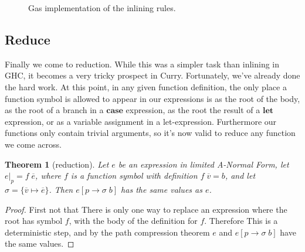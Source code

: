 \documentclass{book}
\makeatletter
\newtheorem{theorem}{Theorem}
\theoremstyle{definition}
\newcommand{\Conid}[1]{\mathit{#1}}
\newcommand{\Varid}[1]{\mathit{#1}}
\newcommand{\anonymous}{\kern0.06em \vbox{\hrule\@width.5em}}
\def\resethooks{%
  \global\let\SaveRestoreHook\empty
  \global\let\ColumnHook\empty}
\newlength{\blanklineskip}
\makeatother
\begin{document}
\begin{figure}
\resethooks
\caption{Gas implementation of the inlining rules.}
\label{fig:inlineCode}
\end{figure}

\subsection{Reduce}

Finally we come to reduction.
While this was a simpler task than inlining in GHC,
it becomes a very tricky prospect in Curry.
Fortunately, we've already done the hard work.
At this point, in any given function definition,
the only place a function symbol is allowed to appear in our expressions is
as the root of the body,
as the root of a branch in a \ensuremath{\mathbf{case}} expression,
as the root the result of a \ensuremath{\mathbf{let}} expression,
or as a variable assignment in a let-expression.
Furthermore our functions only contain trivial arguments,
so it's now valid to reduce any function we come across.

\begin{theorem}[reduction]
Let \ensuremath{\Varid{e}} be an expression in limited A-Normal Form,
let \ensuremath{\Varid{e}|_{\Varid{p}}\mathrel{=}\Varid{f}\;\overline{\Varid{e}} },
where \ensuremath{\Varid{f}} is a function symbol with definition \ensuremath{\Varid{f}\;\overline{\Varid{v}} \mathrel{=}\Varid{b}},
and let $\sigma = \{\overline{ v } \mapsto \overline{e}\}$.
Then \ensuremath{\Varid{e}[\Varid{p}\to\sigma\;\Varid{b}]}
has the same values as \ensuremath{\Varid{e}}.
\end{theorem}

\begin{proof}
First not that There is only one way to replace an expression
where the root has symbol \ensuremath{\Varid{f}}, with the body of the definition for \ensuremath{\Varid{f}}.
Therefore This is a deterministic step, and by the path compression theorem
\ensuremath{\Varid{e}} and \ensuremath{\Varid{e}[\Varid{p}\to\sigma\;\Varid{b}]} have the same values.
\end{proof}
\end{document}

